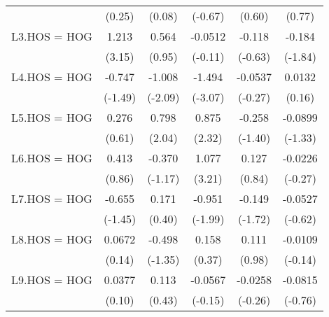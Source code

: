 {\begin{tabular}{l*{5}{c}}
                    &      (0.25)         &      (0.08)         &     (-0.67)         &      (0.60)         &      (0.77)         \\
[1em]
L3.HOS = HOG        &       1.213\sym{**} &       0.564         &     -0.0512         &      -0.118         &      -0.184         \\
                    &      (3.15)         &      (0.95)         &     (-0.11)         &     (-0.63)         &     (-1.84)         \\
[1em]
L4.HOS = HOG        &      -0.747         &      -1.008\sym{*}  &      -1.494\sym{**} &     -0.0537         &      0.0132         \\
                    &     (-1.49)         &     (-2.09)         &     (-3.07)         &     (-0.27)         &      (0.16)         \\
[1em]
L5.HOS = HOG        &       0.276         &       0.798\sym{*}  &       0.875\sym{*}  &      -0.258         &     -0.0899         \\
                    &      (0.61)         &      (2.04)         &      (2.32)         &     (-1.40)         &     (-1.33)         \\
[1em]
L6.HOS = HOG        &       0.413         &      -0.370         &       1.077\sym{**} &       0.127         &     -0.0226         \\
                    &      (0.86)         &     (-1.17)         &      (3.21)         &      (0.84)         &     (-0.27)         \\
[1em]
L7.HOS = HOG        &      -0.655         &       0.171         &      -0.951\sym{*}  &      -0.149         &     -0.0527         \\
                    &     (-1.45)         &      (0.40)         &     (-1.99)         &     (-1.72)         &     (-0.62)         \\
[1em]
L8.HOS = HOG        &      0.0672         &      -0.498         &       0.158         &       0.111         &     -0.0109         \\
                    &      (0.14)         &     (-1.35)         &      (0.37)         &      (0.98)         &     (-0.14)         \\
[1em]
L9.HOS = HOG        &      0.0377         &       0.113         &     -0.0567         &     -0.0258         &     -0.0815         \\
                    &      (0.10)         &      (0.43)         &     (-0.15)         &     (-0.26)         &     (-0.76)         \\

\end{tabular}}
